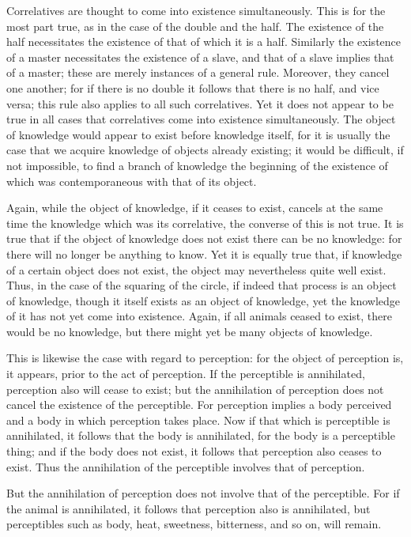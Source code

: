 Correlatives are thought to come into existence simultaneously. This is
for the most part true, as in the case of the double and the half. The
existence of the half necessitates the existence of that of which it is
a half. Similarly the existence of a master necessitates the existence
of a slave, and that of a slave implies that of a master; these are
merely instances of a general rule. Moreover, they cancel one another;
for if there is no double it follows that there is no half, and vice
versa; this rule also applies to all such correlatives. Yet it does not
appear to be true in all cases that correlatives come into existence
simultaneously. The object of knowledge would appear to exist before
knowledge itself, for it is usually the case that we acquire knowledge
of objects already existing; it would be difficult, if not impossible,
to find a branch of knowledge the beginning of the existence of which
was contemporaneous with that of its object.

Again, while the object of knowledge, if it ceases to exist, cancels at
the same time the knowledge which was its correlative, the converse of
this is not true. It is true that if the object of knowledge does not
exist there can be no knowledge: for there will no longer be anything
to know. Yet it is equally true that, if knowledge of a certain object
does not exist, the object may nevertheless quite well exist. Thus, in
the case of the squaring of the circle, if indeed that process is an
object of knowledge, though it itself exists as an object of knowledge,
yet the knowledge of it has not yet come into existence. Again, if all
animals ceased to exist, there would be no knowledge, but there might
yet be many objects of knowledge.

This is likewise the case with regard to perception: for the object of
perception is, it appears, prior to the act of perception. If the
perceptible is annihilated, perception also will cease to exist; but
the annihilation of perception does not cancel the existence of the
perceptible. For perception implies a body perceived and a body in
which perception takes place. Now if that which is perceptible is
annihilated, it follows that the body is annihilated, for the body is a
perceptible thing; and if the body does not exist, it follows that
perception also ceases to exist. Thus the annihilation of the
perceptible involves that of perception.

But the annihilation of perception does not involve that of the
perceptible. For if the animal is annihilated, it follows that
perception also is annihilated, but perceptibles such as body, heat,
sweetness, bitterness, and so on, will remain.

